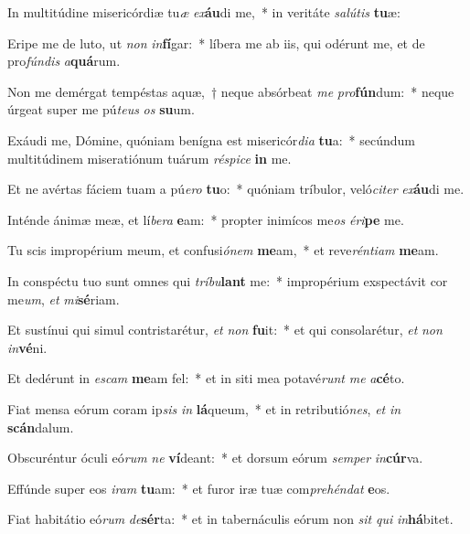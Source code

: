 \item In multitúdine misericórdiæ tu\textit{æ} \textit{ex}\textbf{áu}di me,~* in veritáte \textit{sa}\textit{lú}\textit{tis} \textbf{tu}æ:
\item Eripe me de luto, ut \textit{non} \textit{in}\textbf{fí}gar:~* líbera me ab iis, qui odérunt me, et de pro\textit{fún}\textit{dis} \textit{a}\textbf{quá}rum.
\item Non me demérgat tempéstas aquæ,~† neque absórbeat \textit{me} \textit{pro}\textbf{fún}dum:~* neque úrgeat super me pú\textit{te}\textit{us} \textit{os} \textbf{su}um.
\item Exáudi me, Dómine, quóniam benígna est misericór\textit{di}\textit{a} \textbf{tu}a:~* secúndum multitúdinem miseratiónum tuárum \textit{ré}\textit{spi}\textit{ce} \textbf{in} me.
\item Et ne avértas fáciem tuam a pú\textit{e}\textit{ro} \textbf{tu}o:~* quóniam tríbulor, veló\textit{ci}\textit{ter} \textit{ex}\textbf{áu}di me.
\item Inténde ánimæ meæ, et lí\textit{be}\textit{ra} \textbf{e}am:~* propter inimícos me\textit{os} \textit{é}\textit{ri}\textbf{pe} me.
\item Tu scis impropérium meum, et confusi\textit{ó}\textit{nem} \textbf{me}am,~* et reve\textit{rén}\textit{ti}\textit{am} \textbf{me}am.
\item In conspéctu tuo sunt omnes qui \textit{trí}\textit{bu}\textbf{lant} me:~* impropérium exspectávit cor me\textit{um}, \textit{et} \textit{mi}\textbf{sé}riam.
\item Et sustínui qui simul contristarétur, \textit{et} \textit{non} \textbf{fu}it:~* et qui consolarétur, \textit{et} \textit{non} \textit{in}\textbf{vé}ni.
\item Et dedérunt in \textit{es}\textit{cam} \textbf{me}am fel:~* et in siti mea potavé\textit{runt} \textit{me} \textit{a}\textbf{cé}to.
\item Fiat mensa eórum coram ip\textit{sis} \textit{in} \textbf{lá}queum,~* et in retributió\textit{nes}, \textit{et} \textit{in} \textbf{scán}dalum.
\item Obscuréntur óculi eó\textit{rum} \textit{ne} \textbf{ví}deant:~* et dorsum eórum \textit{sem}\textit{per} \textit{in}\textbf{cúr}va.
\item Effúnde super eos \textit{i}\textit{ram} \textbf{tu}am:~* et furor iræ tuæ com\textit{pre}\textit{hén}\textit{dat} \textbf{e}os.
\item Fiat habitátio eó\textit{rum} \textit{de}\textbf{sér}ta:~* et in tabernáculis eórum non \textit{sit} \textit{qui} \textit{in}\textbf{há}bitet.
